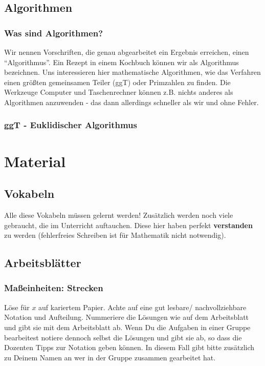 \documentclass[a4paper]{book}%
\newcommand{\anweisungArbeitsblatt}{Löse für $x$ auf kariertem Papier. Achte auf eine gut lesbare/ nachvollziehbare Notation und Aufteilung. Nummeriere die Lösungen wie auf dem Arbeitsblatt und gibt sie mit dem Arbeitsblatt ab. Wenn Du die Aufgaben in einer Gruppe bearbeitest notiere dennoch selbst die Lösungen und gibt sie ab, so dass die Dozenten Tipps zur Notation geben können. In diesem Fall gibt bitte zusätzlich zu Deinem Namen an wer in der Gruppe zusammen gearbeitet hat.}
\theoremstyle{definition}
\begin{document}
\chapter{Algorithmen}

\section{Was sind Algorithmen?}

Wir nennen Vorschriften, die genau abgearbeitet ein Ergebnis erreichen, einen \enquote{Algorithmus}. Ein Rezept in einem Kochbuch können wir als Algorithmus bezeichnen. Uns interessieren hier mathematische Algorithmen, wie das Verfahren einen größten gemeinsamen Teiler (ggT) oder Primzahlen zu finden. Die Werkzeuge Computer und Taschenrechner können z.B. nichts anderes als Algorithmen anzuwenden - das dann allerdings schneller als wir und ohne Fehler.

\section{ggT - Euklidischer Algorithmus}




\part{Material}

\chapter{Vokabeln}

Alle diese Vokabeln müssen gelernt werden! Zusätzlich werden noch viele gebraucht, die im Unterricht auftauchen. Diese hier haben perfekt \textbf{verstanden} zu werden (fehlerfreies Schreiben ist für Mathematik nicht notwendig).



\chapter{Arbeitsblätter}

\newpage
\section{Maßeinheiten: Strecken}

\anweisungArbeitsblatt
\end{document}
